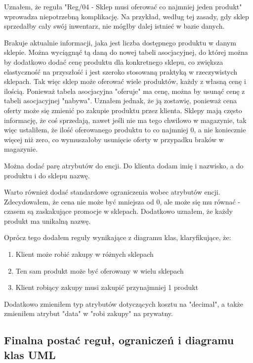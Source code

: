 \documentclass[a4paper,12pt]{article}
\begin{document}
Uznałem, że reguła "Reg/04 - Sklep musi oferować co najmniej jeden produkt" wprowadza niepotrzebną komplikację. Na przykład, według tej zasady, gdy sklep sprzedałby cały swój inwentarz, nie mógłby dalej istnieć w bazie danych.

Brakuje aktualnie informacji, jaka jest liczba dostępnego produktu w danym sklepie. Można wyciągnąć tą daną do nowej tabeli asocjacyjnej, do której można by dodatkowo dodać cenę produktu dla konkretnego sklepu, co zwiększa elastyczność na przyszłość i jest szeroko stosowaną praktyką w rzeczywistych sklepach. Tak więc sklep może oferować wiele produktów, każdy z własną cenę i ilością. 
Ponieważ tabela asocjacyjna "oferuje" ma cenę, można by usunąć cenę z tabeli asocjacyjnej "nabywa". Uznałem jednak, że ją zostawię, ponieważ cena oferty może się zmienić po zakupie produktu przez klienta. 
Sklepy mają często informację, że coś sprzedają, nawet jeśli nie ma tego chwilowo w magazynie, tak więc ustaliłem, że ilość oferowanego produktu to co najmniej 0, a nie koniecznie więcej niż zero, co wymuszałoby usunięcie oferty w przypadku braków w magazynie.

Można dodać parę atrybutów do encji. Do klienta dodam imię i nazwisko, a do produktu i do sklepu nazwę.

Warto również dodać standardowe ograniczenia wobec atrybutów encji. Zdecydowałem, że cena nie może być mniejsza od 0, ale może się mu równać - czasem są zaskakujące promocje w sklepach. Dodatkowo uznałem, że każdy produkt ma unikalną nazwę.

Oprócz tego dodałem reguły wynikające z diagramu klas, klaryfikujące, że:

\begin{enumerate}
    \item Klient może robić zakupy w różnych sklepach
    \item Ten sam produkt może być oferowany w wielu sklepach
    \item Klient robiący zakupy musi zakupić przynajmniej 1 produkt
\end{enumerate}

Dodatkowo zmieniłem typ atrybutów dotyczących kosztu na "decimal", a także zmieniłem atrybut "data" w "robi zakupy" na prywatny.

\newpage
\subsection{Finalna postać reguł, ograniczeń i diagramu klas UML}
\end{document}
